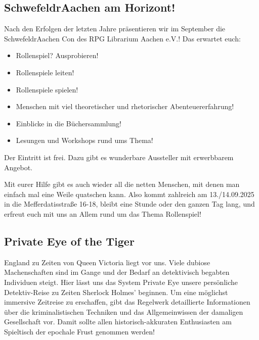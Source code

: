 \documentclass[final]{multiversum}
\newcommand{\schwedra}{Schwefel\-drAachen}
\newcommand{\schwedracon}{Schwefel\-drAachen Con}
\begin{document}
\makemultititle
%


\subsection{\schwedra{} am Horizont!}
Nach den Erfolgen der letzten Jahre präsentieren wir im September die \schwedracon{} des RPG Librarium Aachen e.V.!
Das erwartet euch:
\vspace{1em}
\begin{itemize}
  \item Rollenspiel? Ausprobieren!
  \item Rollenspiele leiten!
  \item Rollenspiele spielen!
  \item Menschen mit viel theoretischer und rhetorischer Abenteuererfahrung!
  \item Einblicke in die Büchersammlung!
  \item Lesungen und Workshops rund ums Thema!
\end{itemize}
\vspace{1em}

Der Eintritt ist frei. Dazu gibt es wunderbare Aussteller mit erwerbbarem Angebot.

Mit eurer Hilfe gibt es auch wieder all die netten Menschen, mit denen man einfach mal eine Weile quatschen kann.
Also kommt zahlreich am 13./14.09.2025 in die Mefferdatisstraße 16-18, bleibt eine Stunde oder den ganzen Tag lang,
und erfreut euch mit uns an Allem rund um das Thema Rollenspiel!

\subsection{Private Eye of the Tiger}

England zu Zeiten von Queen Victoria liegt vor uns. Viele dubiose Machenschaften sind im Gange und der Bedarf an detektivisch begabten Individuen steigt.
Hier lässt uns das System Private Eye unsere persönliche Detektiv-Reise zu Zeiten Sherlock Holmes' beginnen.
Um eine möglichst immersive Zeitreise zu erschaffen, 
gibt das Regelwerk detaillierte Informationen über die kriminalistischen Techniken und das Allgemeinwissen der damaligen Gesellschaft vor. 
Damit sollte allen historisch-akkuraten Enthusiasten am Spieltisch der epochale Frust genommen werden!
\end{document}
